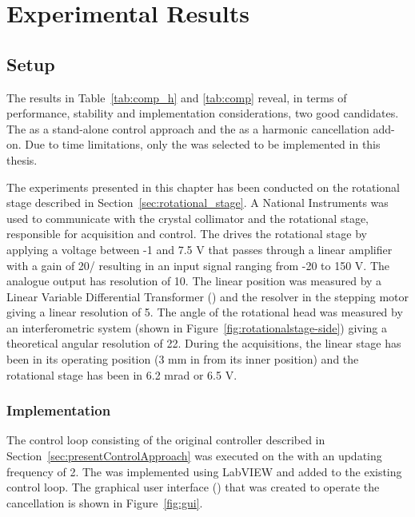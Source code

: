 \chapter{Experimental Results}\label{cha:exp_result}
\section{Setup}\label{sec:setup}
The results in Table~\ref{tab:comp_h} and \ref{tab:comp} reveal, in terms of performance, stability and implementation considerations, two good candidates. The \abbrIRC as a stand-alone control approach and the \abbrRFDC as a harmonic cancellation add-on. Due to time limitations, only the \abbrRFDC was selected to be implemented in this thesis.

The experiments presented in this chapter has been conducted on the rotational stage described in Section~\ref{sec:rotational_stage}. A National Instruments \abbrPXI was used to communicate with the crystal collimator and the rotational stage, responsible for acquisition and control. The \abbrPXI drives the rotational stage by applying a voltage between -1 and 7.5 V that passes through a linear amplifier with a gain of \unit{20}{\volt/\volt} resulting in an input signal ranging from -20 to 150 V. The analogue output has resolution of \unit{10}{\micro\volt}. The linear position was measured by a Linear Variable Differential Transformer (\abbrLVDT) and the resolver in the stepping motor giving a linear resolution of \unit{5}{\micro\meter}. The angle of the rotational head was measured by an interferometric system (shown in Figure~\ref{fig:rotationalstage-side}) giving a theoretical angular resolution of \unit{22}{\pico\radian}. During the acquisitions, the linear stage has been in its operating position (3 mm in from its inner position) and the rotational stage has been in 6.2 mrad or 6.5 V.

\subsection{Implementation}
The control loop consisting of the original controller described in Section~\ref{sec:presentControlApproach} was executed on the \abbrPXI with an updating frequency of \unit{2}{\kilo\hertz}. The \abbrRFDC was implemented using LabVIEW and added to the existing control loop. The graphical user interface (\abbrGUI) that was created to operate the cancellation is shown in Figure~\ref{fig:gui}.

